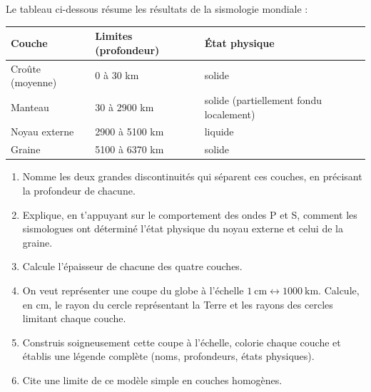 \documentclass[11pt]{article}
\begin{document}
\begin{exercice}
Le tableau ci-dessous résume les résultats de la sismologie mondiale :
\begin{center}
\begin{tabularx}{\linewidth}{|l|X|X|}\hline
\rowcolor{popblueL} Couche & Limites (profondeur) & État physique \\ \hline
Croûte (moyenne) & 0 à 30 km & solide \\ \hline
Manteau & 30 à 2900 km & solide (partiellement fondu localement) \\ \hline
Noyau externe & 2900 à 5100 km & liquide \\ \hline
Graine & 5100 à 6370 km & solide \\ \hline
\end{tabularx}
\end{center}
\begin{enumerate}
\item Nomme les deux grandes discontinuités qui séparent ces couches, en précisant la profondeur de chacune.
\item Explique, en t'appuyant sur le comportement des ondes P et S, comment les sismologues ont déterminé l'état physique du noyau externe et celui de la graine.
\item Calcule l'épaisseur de chacune des quatre couches.
\item On veut représenter une coupe du globe à l'échelle $1\ \text{cm} \leftrightarrow 1000\ \text{km}$. Calcule, en cm, le rayon du cercle représentant la Terre et les rayons des cercles limitant chaque couche.
\item Construis soigneusement cette coupe à l'échelle, colorie chaque couche et établis une légende complète (noms, profondeurs, états physiques).
\item Cite une limite de ce modèle simple en couches homogènes.
\end{enumerate}
\end{exercice}
\end{document}
